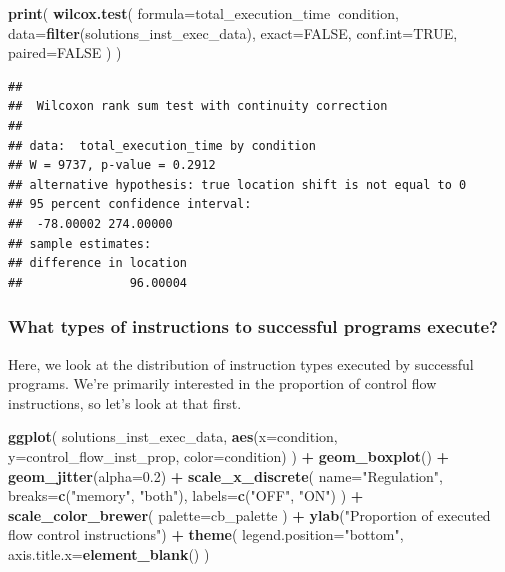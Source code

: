 \documentclass[]{book}
\newenvironment{Shaded}{\begin{snugshade}}{\end{snugshade}}
\newcommand{\DataTypeTok}[1]{\textcolor[rgb]{0.13,0.29,0.53}{#1}}
\newcommand{\FloatTok}[1]{\textcolor[rgb]{0.00,0.00,0.81}{#1}}
\newcommand{\KeywordTok}[1]{\textcolor[rgb]{0.13,0.29,0.53}{\textbf{#1}}}
\newcommand{\NormalTok}[1]{#1}
\newcommand{\OperatorTok}[1]{\textcolor[rgb]{0.81,0.36,0.00}{\textbf{#1}}}
\newcommand{\OtherTok}[1]{\textcolor[rgb]{0.56,0.35,0.01}{#1}}
\newcommand{\StringTok}[1]{\textcolor[rgb]{0.31,0.60,0.02}{#1}}
\begin{document}
\begin{Shaded}
\begin{Highlighting}[]
\KeywordTok{print}\NormalTok{(}
  \KeywordTok{wilcox.test}\NormalTok{(}
    \DataTypeTok{formula=}\NormalTok{total_execution_time}\OperatorTok{~}\NormalTok{condition,}
    \DataTypeTok{data=}\KeywordTok{filter}\NormalTok{(solutions_inst_exec_data),}
    \DataTypeTok{exact=}\OtherTok{FALSE}\NormalTok{,}
    \DataTypeTok{conf.int=}\OtherTok{TRUE}\NormalTok{,}
    \DataTypeTok{paired=}\OtherTok{FALSE}
\NormalTok{  )}
\NormalTok{)}
\end{Highlighting}
\end{Shaded}

\begin{verbatim}
## 
##  Wilcoxon rank sum test with continuity correction
## 
## data:  total_execution_time by condition
## W = 9737, p-value = 0.2912
## alternative hypothesis: true location shift is not equal to 0
## 95 percent confidence interval:
##  -78.00002 274.00000
## sample estimates:
## difference in location 
##               96.00004
\end{verbatim}

\hypertarget{what-types-of-instructions-to-successful-programs-execute-2}{%
\subsubsection{What types of instructions to successful programs execute?}\label{what-types-of-instructions-to-successful-programs-execute-2}}

Here, we look at the distribution of instruction types executed by successful programs.
We're primarily interested in the proportion of control flow instructions, so let's look at that first.

\begin{Shaded}
\begin{Highlighting}[]
\KeywordTok{ggplot}\NormalTok{( solutions_inst_exec_data, }\KeywordTok{aes}\NormalTok{(}\DataTypeTok{x=}\NormalTok{condition, }\DataTypeTok{y=}\NormalTok{control_flow_inst_prop, }\DataTypeTok{color=}\NormalTok{condition) ) }\OperatorTok{+}
\StringTok{  }\KeywordTok{geom_boxplot}\NormalTok{() }\OperatorTok{+}
\StringTok{  }\KeywordTok{geom_jitter}\NormalTok{(}\DataTypeTok{alpha=}\FloatTok{0.2}\NormalTok{) }\OperatorTok{+}
\StringTok{  }\KeywordTok{scale_x_discrete}\NormalTok{(}
    \DataTypeTok{name=}\StringTok{"Regulation"}\NormalTok{,}
    \DataTypeTok{breaks=}\KeywordTok{c}\NormalTok{(}\StringTok{"memory"}\NormalTok{, }\StringTok{"both"}\NormalTok{),}
    \DataTypeTok{labels=}\KeywordTok{c}\NormalTok{(}\StringTok{"OFF"}\NormalTok{, }\StringTok{"ON"}\NormalTok{)}
\NormalTok{  ) }\OperatorTok{+}
\StringTok{  }\KeywordTok{scale_color_brewer}\NormalTok{(}
    \DataTypeTok{palette=}\NormalTok{cb_palette}
\NormalTok{  ) }\OperatorTok{+}
\StringTok{  }\KeywordTok{ylab}\NormalTok{(}\StringTok{"Proportion of executed flow control instructions"}\NormalTok{) }\OperatorTok{+}
\StringTok{  }\KeywordTok{theme}\NormalTok{(}
    \DataTypeTok{legend.position=}\StringTok{"bottom"}\NormalTok{,}
    \DataTypeTok{axis.title.x=}\KeywordTok{element_blank}\NormalTok{()}
\NormalTok{  )}
\end{Highlighting}
\end{Shaded}
\end{document}

